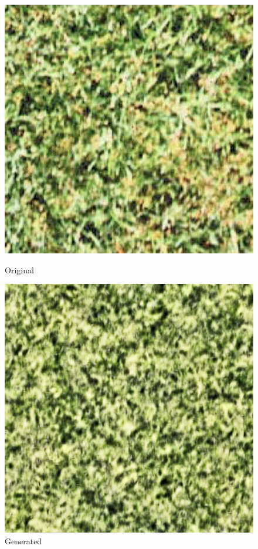 \documentclass{article}
\begin{document}
    \begin{figure}[!htb]
    \begin{center}
      \includegraphics[scale=.34]{5/report/steerable/9.png}
      \caption{Original}
    \end{center}
    \endminipage \hfill
    \begin{center}
      \includegraphics[scale=.34]{5/report/steerable/9_c.png}
      \caption{Generated}
    \end{center}
    \endminipage
    \end{figure} 
\end{document}
